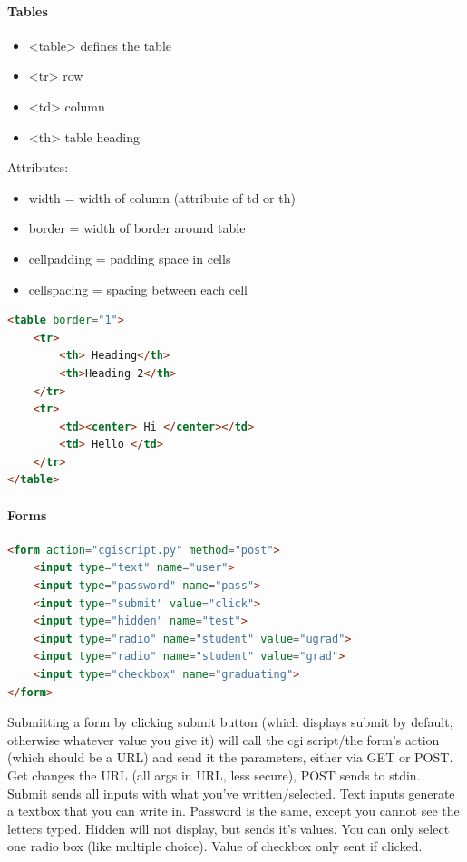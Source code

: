 \documentclass[12 pt]{article}
\begin{document}
\paragraph{Tables}
\begin{itemize}
\item <table> defines the table
\item <tr> row
\item <td> column
\item <th> table heading
\end{itemize}
Attributes:
\begin{itemize}
\item width = width of column (attribute of td or th)
\item border = width of border around table
\item cellpadding = padding space in cells
\item cellspacing = spacing between each cell
\end{itemize}
\begin{lstlisting}[language=html]
<table border="1">
    <tr>
        <th> Heading</th>
        <th>Heading 2</th>
    </tr>
    <tr>
        <td><center> Hi </center></td>
        <td> Hello </td>
    </tr>
</table>
\end{lstlisting}
\paragraph{Forms}
\begin{lstlisting}[language=html]
<form action="cgiscript.py" method="post">
    <input type="text" name="user">
    <input type="password" name="pass">
    <input type="submit" value="click">
    <input type="hidden" name="test">
    <input type="radio" name="student" value="ugrad">
    <input type="radio" name="student" value="grad">
    <input type="checkbox" name="graduating">
</form>
\end{lstlisting}
Submitting a form by clicking submit button (which displays submit by default, otherwise whatever value you give it) will call the cgi script/the form's action (which should be a URL) and send it the parameters, either via GET or POST. Get changes the URL (all args in URL, less secure), POST sends to stdin. Submit sends all inputs with what you've written/selected. Text inputs generate a textbox that you can write in. Password is the same, except you cannot see the letters typed. Hidden will not display, but sends it's values. You can only select one radio box (like multiple choice). Value of checkbox only sent if clicked.
\end{document}
